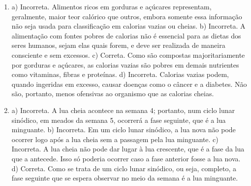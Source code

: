 \begin{enumerate}
\item
a) Incorreta. Alimentos ricos em gorduras e açúcares representam,
geralmente, maior teor calórico que outros, embora somente essa
informação não seja usada para classificação em calorias vazias ou
cheias.
b) Incorreta. A alimentação com fontes pobres de calorias não é
essencial para as dietas dos seres humanos, sejam elas quais forem, e
deve ser realizada de maneira consciente e sem excessos.
c) Correta. Como são compostas majoritariamente por gorduras e açúcares,
as calorias vazias são pobres em demais nutrientes como vitaminas,
fibras e proteínas.
d) Incorreta. Calorias vazias podem, quando ingeridas em excesso, causar
doenças como o câncer e a diabetes. Não são, portanto, menos ofensivas
ao organismo que as calorias cheias.

\item
a) Incorreta. A lua cheia acontece na semana 4; portanto, num ciclo
lunar sinódico, em meados da semana 5, ocorrerá a fase seguinte, que é a
lua minguante.
b) Incorreta. Em um ciclo lunar sinódico, a lua nova não pode ocorrer
logo após a lua cheia sem a passagem pela lua minguante.
c) Incorreta. A lua cheia não pode dar lugar à lua crescente, que é a
fase da lua que a antecede. Isso só poderia ocorrer caso a fase anterior
fosse a lua nova.
d) Correta. Como se trata de um ciclo lunar sinódico, ou seja, completo,
a fase seguinte que se espera observar no meio da semana é a lua
minguante.
\end{enumerate}

